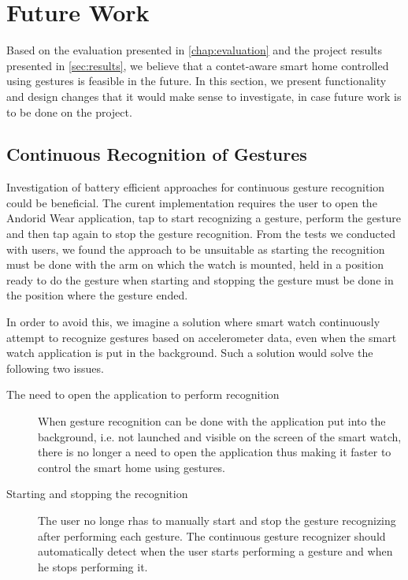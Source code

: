 \section{Future Work}
\label{sec:conclusion:future-work}

Based on the evaluation presented in \cref{chap:evaluation} and the project results presented in \cref{sec:results}, we believe that a contet-aware smart home controlled using gestures is feasible in the future. 
In this section, we present functionality and design changes that it would make sense to investigate, in case future work is to be done on the project.

\subsection{Continuous Recognition of Gestures}

Investigation of battery efficient approaches for continuous gesture recognition could be beneficial. The curent implementation requires the user to open the Andorid Wear application, tap to start recognizing a gesture, perform the gesture and then tap again to stop the gesture recognition. From the tests we conducted with users, we found the approach to be unsuitable as starting the recognition must be done with the arm on which the watch is mounted, held in a position ready to do the gesture when starting and stopping the gesture must be done in the position where the gesture ended.

In order to avoid this, we imagine a solution where smart watch continuously attempt to recognize gestures based on accelerometer data, even when the smart watch application is put in the background. Such a solution would solve the following two issues.

\begin{description}
\item[The need to open the application to perform recognition] When gesture recognition can be done with the application put into the background, i.e. not launched and visible on the screen of the smart watch, there is no longer a need to open the application thus making it faster to control the smart home using gestures.
\item[Starting and stopping the recognition] The user no longe rhas to manually start and stop the gesture recognizing after performing each gesture. The continuous gesture recognizer should automatically detect when the user starts performing a gesture and when he stops performing it.
\end{description}

